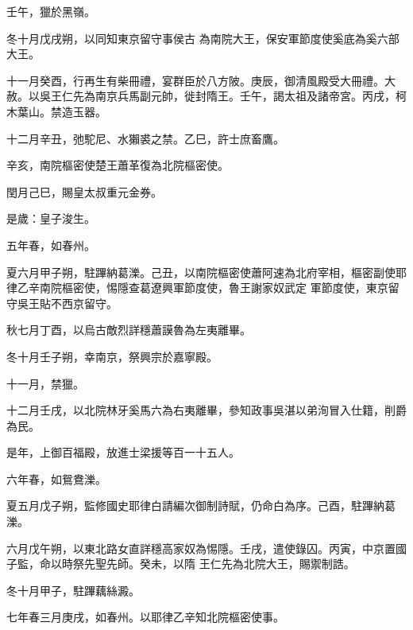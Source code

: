 \begin{pinyinscope}
 壬午，獵於黑嶺。



 冬十月戊戌朔，以同知東京留守事侯古
 為南院大王，保安軍節度使奚底為奚六部大王。



 十一月癸酉，行再生有柴冊禮，宴群臣於八方陂。庚辰，御清風殿受大冊禮。大赦。以吳王仁先為南京兵馬副元帥，徙封隋王。壬午，謁太祖及諸帝宮。丙戌，柯木葉山。禁造玉器。



 十二月辛丑，弛駝尼、水獺裘之禁。乙巳，許士庶畜鷹。



 辛亥，南院樞密使楚王蕭革復為北院樞密使。



 閏月己巳，賜皇太叔重元金券。



 是歲：皇子浚生。



 五年春，如春州。



 夏六月甲子朔，駐蹕納葛濼。己丑，以南院樞密使蕭阿速為北府宰相，樞密副使耶律乙辛南院樞密使，惕隱查葛遼興軍節度使，魯王謝家奴武定
 軍節度使，東京留守吳王貼不西京留守。



 秋七月丁酉，以烏古敵烈詳穩蕭謨魯為左夷離畢。



 冬十月壬子朔，幸南京，祭興宗於嘉寧殿。



 十一月，禁獵。



 十二月壬戌，以北院林牙奚馬六為右夷離畢，參知政事吳湛以弟洵冒入仕籍，削爵為民。



 是年，上御百福殿，放進士梁援等百一十五人。



 六年春，如鴛鴦濼。



 夏五月戊子朔，監修國史耶律白請編次御制詩賦，仍命白為序。己酉，駐蹕納葛濼。



 六月戊午朔，以東北路女直詳穩高家奴為惕隱。壬戌，遣使錄囚。丙寅，中京置國子監，命以時祭先聖先師。癸未，以隋
 王仁先為北院大王，賜禦制誥。



 冬十月甲子，駐蹕藕絲澱。



 七年春三月庚戌，如春州。以耶律乙辛知北院樞密使事。




\end{pinyinscope}

